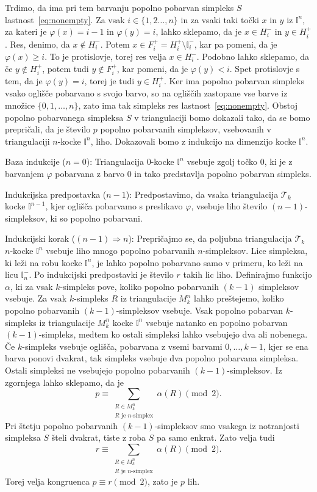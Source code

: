\documentclass[mat1]{fmfdelo}
\newcommand{\I}{\mathbb I}
\newcommand{\0}{0}
\newcommand{\pT}{\mathcal T}
\begin{document}
\begin{dokaz}
Trdimo, da ima pri tem barvanju popolno pobarvan simpleks $S$ lastnost~\eqref{eq:nonempty}. 
Za vsak $i \in \{1, 2 \dots, n \}$ in za vsaki taki točki $x$ in $y$ iz $\I^n$, za kateri je $\varphi(x) = i - 1$ in $\varphi(y) = i$, lahko sklepamo, da je $x \in H_{i}^-$ in $y \in H_i^+$. Res, denimo, da $x \notin H_{i}^-$. Potem $x \in F_i^+ = H_{i}^+ \setminus \I_i^-$, kar pa pomeni, da je $\varphi(x) \geq i$. To je protislovje, torej res velja $x \in H_{i}^-$. Podobno lahko sklepamo, da če $y \notin H_i^+$, potem tudi $y \notin F_i^+$, kar pomeni, da je $\varphi(y) < i$. Spet protislovje s tem, da je $\varphi(y) = i$, torej je tudi $y \in H_i^+$.
Ker ima popolno pobarvan simpleks vsako oglišče pobarvano s svojo barvo, so na ogliščih zastopane vse barve iz množice $\{ 0, 1, \dots, n \}$, zato ima tak simpleks res lastnost~\eqref{eq:nonempty}. 
Obstoj popolno pobarvanega simpleksa $S$ v triangulaciji bomo dokazali tako, da se bomo prepričali, da je število $p$ popolno pobarvanih simpleksov, vsebovanih v triangulaciji $n$-kocke $\I^n$, liho. Dokazovali bomo z indukcijo na dimenzijo kocke $\I^n$.

Baza indukcije ($n = 0$):
Triangulacija $0$-kocke $\I^n$ vsebuje zgolj točko $\0$, ki je z barvanjem $\varphi$ pobarvana z barvo $0$ in tako predstavlja popolno pobarvan simpleks.

Indukcijska predpostavka ($n - 1$):
Predpostavimo, da vsaka triangulacija $\pT_k$ kocke $\I^{n-1}$, kjer oglišča pobarvamo s preslikavo $\varphi$, vsebuje liho število $(n - 1)$-simpleksov, ki so popolno pobarvani.

Indukcijski korak ($(n - 1) \Longrightarrow n$):
Prepričajmo se, da poljubna triangulacija $\pT_k$ $n$-kocke $\I^n$ vsebuje liho mnogo popolno pobarvanih $n$-simpleksov. Lice simpleksa, ki leži na robu kocke $\I^n$, je lahko popolno pobarvano samo v primeru, ko leži na licu $\I_n^-$. Po indukcijski predpostavki je število $r$ takih lic liho. 
Definirajmo funkcijo $\alpha$, ki za vsak $k$-simpleks pove, koliko popolno pobarvanih $(k-1)$ simpleksov vsebuje. Za vsak $k$-simpleks $R$ iz triangulacije $M_k^n$ lahko preštejemo, koliko popolno pobarvanih $(k-1)$-simpleksov vsebuje. Vsak popolno pobarvan $k$-simpleks iz triangulacije $M_k^n$ kocke $\I^n$ vsebuje natanko en popolno pobarvan $(k-1)$-simpleks, medtem ko ostali simpleksi lahko vsebujejo dva ali nobenega. Če $k$-simpleks vsebuje oglišča, pobarvana z vsemi barvami $0, \dots, k-1$, kjer se ena barva ponovi dvakrat, tak simpleks vsebuje dva popolno pobarvana simpleksa. Ostali simpleksi ne vsebujejo popolno pobarvanih $(k - 1)$-simpleksov. Iz zgornjega lahko sklepamo, da je 
$$p \equiv 
\sum\limits_{\substack{
R \in M_k^n
 \\ 
R\text{ je } n\text{-simplex}
 }}
  \alpha(R) \pmod 2.$$
Pri štetju popolno pobarvanih $(k - 1)$-simpleksov smo vsakega iz notranjosti simpleksa $S$ šteli dvakrat, tiste z roba $S$ pa samo enkrat. Zato velja tudi 
$$r \equiv 
\sum\limits_{\substack{
R \in M_k^n
 \\ 
R\text{ je } n\text{-simplex}
 }}
  \alpha(R) \pmod 2.$$ 
Torej velja kongruenca $p \equiv r \pmod 2$, zato je $p$ lih.
\end{dokaz}
\end{document}
